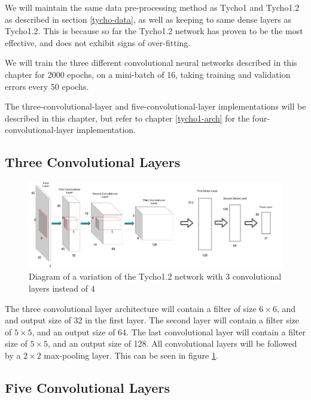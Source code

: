 \documentclass[12pt,a4paper,oneside,oldfontcommands]{memoir}
\begin{document}
\begin{Declaration Of OriginalityOrginality}
We will maintain the same data pre-processing method as Tycho1 and Tycho1.2 as described in section \ref{tycho-data}, as well as keeping to same dense layers as Tycho1.2. This is because so far the Tycho1.2 network has proven to be the most effective, and does not exhibit signs of over-fitting. 

We will train the three different convolutional neural networks described in this chapter for 2000 epochs, on a mini-batch of 16, taking training and validation errors every 50 epochs. 

The three-convolutional-layer and five-convolutional-layer implementations will be described in this chapter, but refer to chapter \ref{tycho1-arch} for the four-convolutional-layer implementation. 

\subsection{Three Convolutional Layers}

\begin{figure}[H]
  \centering
    \includegraphics[width=\linewidth]{images/Tychoconv3.png}
    \caption{Diagram of a variation of the Tycho1.2 network with 3 convolutional layers instead of 4}
      \label{fig:conv3}
\end{figure}


The three convolutional layer architecture will contain a filter of size \(6\times6\), and and output size of 32 in the first layer. The second layer will contain a filter size of \(5\times5\), and an output size of 64. The last convolutional layer will contain a filter size of \(5\times5\), and an output size of 128. All convolutional layers will be followed by a \(2\times2\) max-pooling layer. This can be seen in figure \ref{fig:conv3}.

\subsection{Five Convolutional Layers}



\end{Declaration Of OriginalityOrginality}
\end{document}
